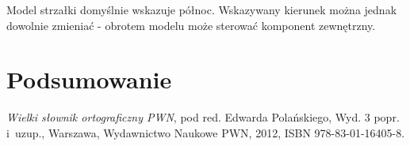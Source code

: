 \documentclass[a4paper,twocolumn,11pt]{article}
\begin{document}
% 
 
 Model strzałki domyślnie wskazuje północ.
 Wskazywany kierunek można jednak dowolnie zmieniać - obrotem modelu może sterować komponent zewnętrzny.



\section{Podsumowanie}



\begin{thebibliography}{9}
 \small
 
  \emph{Wielki słownik ortograficzny PWN},
  pod red. Edwarda Polańskiego,
  Wyd. 3 popr. i~uzup.,
  Warszawa,
  Wydawnictwo Naukowe PWN,
  2012,
  ISBN 978-83-01-16405-8.

\end{thebibliography}
\end{document}

